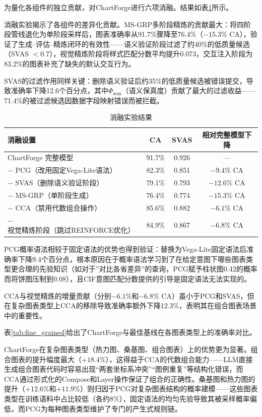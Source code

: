 为量化各组件的独立贡献，对ChartForge进行六项消融。结果如表\ref{tab:ablation}所示。

消融实验揭示了各组件的差异化贡献。MS-GRP多阶段精炼的贡献最大：将四阶段管线退化为单阶段采样后，图表准确率从91.7\%骤降至76.4\%（$-15.3\%$ CA），验证了生成--评估--精炼闭环的有效性——语义验证阶段过滤了约40\%的低质量候选（SVAS $< 0.7$），视觉精炼阶段将样式匹配分数平均提升0.073，交互注入阶段为83.2\%的图表补充了缺失的默认交互行为。

SVAS的过滤作用同样关键：删除语义验证后约35\%的低质量候选被错误提交，导致准确率下降12.6个百分点，其中$\Phi_{\text{sem}}$（语义保真度）贡献了最大的过滤收益——71.4\%的被过滤候选因数据字段映射错误而被拦截。

\begin{table}[H]
\centering
\caption{消融实验结果}
\label{tab:ablation}
\begin{tabularx}{\linewidth}{>{\raggedright\arraybackslash}p{5.5cm}c|c|c}
\toprule
\textbf{消融设置} & \textbf{CA} & \textbf{SVAS} & \textbf{相对完整模型下降} \\
\midrule
ChartForge 完整模型 & 91.7\% & 0.926 & — \\
$-$ PCG（改用固定Vega-Lite语法）& 82.3\% & 0.851 & $-9.4\%$ CA \\
$-$ SVAS（删除语义验证阶段）& 79.1\% & 0.793 & $-12.6\%$ CA \\
$-$ MS-GRP（单阶段生成）& 76.4\% & 0.774 & $-15.3\%$ CA \\
$-$ CCA（禁用代数组合操作）& 85.6\% & 0.882 & $-6.1\%$ CA \\
$-$ 视觉精炼阶段（跳过REINFORCE优化）& 84.9\% & 0.867 & $-6.8\%$ CA \\
\bottomrule
\end{tabularx}
\end{table}



PCG概率语法相较于固定语法的优势也得到验证：替换为Vega-Lite固定语法后准确率下降9.4个百分点，根本原因在于概率语法学习到了在给定意图下哪些图表类型更合理的先验知识（如对于”对比各省差异”的查询，PCG赋予柱状图0.42的概率而将饼图压制到0.08），且CIF意图匹配分数提供的引导是固定语法无法实现的。

CCA与视觉精炼的增量贡献（分别$-6.1\%$和$-6.8\%$ CA）虽小于PCG和SVAS，但在复杂图表类型上CCA的移除导致准确率额外下降12.3\%，表明其在组合图表场景中的重要性。


表\ref{tab:fine_grained}给出了ChartForge与最佳基线在各图表类型上的准确率对比。

ChartForge在复杂图表类型（热力图、桑基图、组合图表）上的优势更为显著。组合图表的提升幅度最大（$+18.4\%$），这得益于CCA的代数组合能力——LLM直接生成组合图表代码时容易出现“两套坐标系冲突”“图例重复”等结构化错误，而CCA通过形式化的Compose和Layer操作保证了组合的正确性。桑基图和热力图的提升（$+12.6\%$和$+11.9\%$）则归因于PCG对复杂图表结构的概率建模——这些图表类型在训练语料中占比较低（各约8\%），固定语法的均匀先验导致其被采样概率偏低，而PCG为每种图表类型维护了专门的产生式规则链。

